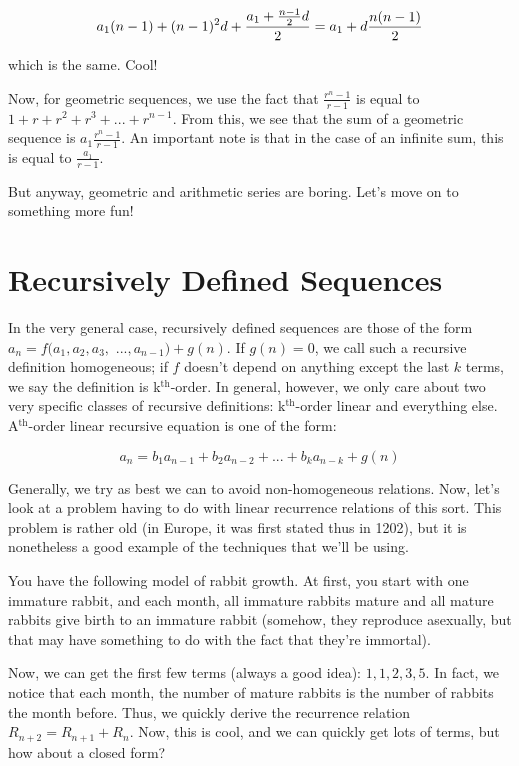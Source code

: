 \documentclass[12pt,letterpaper]{article}
\renewcommand{\th}{\ensuremath{^{\text{th}}}}
\begin{document}
$$a_1 (n - 1) + (n - 1)^2 d + \frac{a_1 + \frac{n - 1}{2} d}{2} \\
= a_1 + d \frac{n (n-1)}{2}$$

which is the same. Cool!

Now, for geometric sequences, we use the fact that $\frac{r^n - 1}{r
  - 1}$ is equal to $1 + r + r^2 + r^3 + ... + r^{n-1}$. From this, we
see that the sum of a geometric sequence is $a_1 \frac{r^n - 1}{r -
  1}$. An important note is that in the case of an infinite sum, this
is equal to $\frac{a_1}{r - 1}$.

But anyway, geometric and arithmetic series are boring. Let's move on to
something more fun!

\section{Recursively Defined Sequences}
In the very general case, recursively defined sequences are those of
the form $a_n = f(a_1, a_2, a_3,$ $..., a_{n-1}) + g(n)$. If $g(n) = 0$,
we call such a recursive definition homogeneous; if $f$ doesn't depend
on anything except the last $k$ terms, we say the definition is
k\th-order. In general, however, we only care about two very
specific classes of recursive definitions: k\th-order linear and
everything else. A\th-order linear recursive equation is one of
the form:

$$a_n = b_1 a_{n-1} + b_2 a_{n-2} + ... + b_k a_{n - k} + g(n)$$

Generally, we try as best we can to avoid non-homogeneous
relations. Now, let's look at a problem having to do with linear
recurrence relations of this sort. This problem is rather old (in
Europe, it was first stated thus in 1202), but it is nonetheless a
good example of the techniques that we'll be using.

You have the following model of rabbit growth. At first, you start
with one immature rabbit, and each month, all immature rabbits mature
and all mature rabbits give birth to an immature rabbit (somehow, they
reproduce asexually, but that may have something to do with the fact
that they're immortal).

Now, we can get the first few terms (always a good idea): $1, 1, 2, 3,
5$.  In fact, we notice that each month, the number of mature rabbits
is the number of rabbits the month before. Thus, we quickly derive the
recurrence relation $R_{n+2} = R_{n+1} + R_n$. Now, this is cool, and
we can quickly get lots of terms, but how about a closed form?
\end{document}
